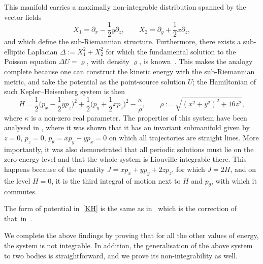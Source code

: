 This manifold carries a maximally non-integrable distribution spanned
by the vector fields
\begin{equation*}
 X_1 = \partial_x - \frac12 y\partial_z,\qquad
 X_2 = \partial_y + \frac12 x\partial_z,
\end{equation*}
and which define the sub-Riemannian structure. Furthermore, there
exists a sub-elliptic Laplacian $\Delta:=X_1^2+X_2^2$ for which the
fundamental solution to the Poisson equation $\Delta U=\varrho$, with density $\varrho$, is known~\cite{Folland}. This makes the analogy complete because one can
construct the kinetic energy with the sub-Riemannian metric, and take
the potential as the point-source solution $U$;
the Hamiltonian of such Kepler--Heisenberg system is then
\begin{equation}
 \label{KH}
 H = \frac12 \bigg(p_x - \frac12 y p_z\bigg)^2 + \frac12\bigg(p_y+\frac12 x p_z\bigg)^2
 - \frac{\kappa}{\rho}, \qquad
 \rho:=\sqrt{(x^2+y^2)^2+{16}z^2},
\end{equation}
where $\kappa$ is a non-zero real parameter. The properties of this
system have been analysed in \cite{dots, 1,2}, where it was shown that it
has an invariant submanifold given by $z=0$, $p_z=0$,
$p_{\theta} = x p_y -y p_x=0$ on which all trajectories are straight
lines. More importantly, it was also demonstrated that all periodic
solutions must lie on the zero-energy level and that the whole system
is Liouville integrable there. This happens because of the quantity
$J=x p_x+ y p_y +2 z p_z$, for which $\dot{J} = 2H$, and on the level
$H=0$, it is the third integral of motion next to $H$ and
$p_{\theta}$, with which it commutes.
\begin{Remark}\label{rem1}
 The form of potential in~\eqref{KH} is the same as in~\cite{dots} which is the correction of that~in~\cite{1}.
\end{Remark}
We complete the above findings by proving that for all the other
values of energy, the system is not integrable. In addition, the generalisation of the above system to two bodies is straightforward, and we prove its non-integrability as well.

